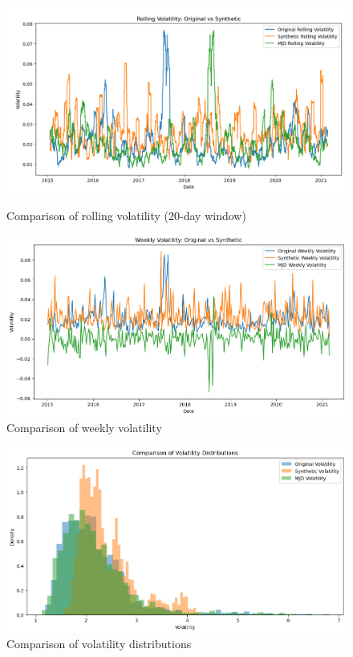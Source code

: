 \documentclass[12pt]{article}
\numberwithin{equation}{section}
\begin{document}
\begin{figure}[h!]
    \centering
    \begin{minipage}{0.48\textwidth}
        \centering
        \includegraphics[width=\linewidth]{rollingvol.png}
        \caption{Comparison of rolling volatility (20-day window)}
        \label{fig:rollingvol}
    \end{minipage}
    \hfill
    \begin{minipage}{0.48\textwidth}
        \centering
        \includegraphics[width=\linewidth]{weeklyvol.png}
        \caption{Comparison of weekly volatility}
        \label{fig:weeklyvol}
    \end{minipage}
\end{figure}
\begin{figure}[h!]
  \centering 
  \includegraphics[scale=0.35]{voldist2.png}
  \caption{Comparison of volatility distributions}
  \label{fig:voldist2}
\end{figure}
\end{document}
